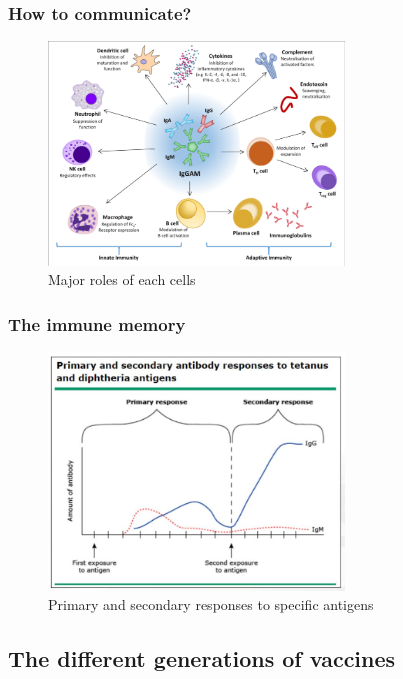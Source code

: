 \begin{frame}
    \frametitle{How to communicate?}
\begin{figure}
    \centering
    \includegraphics[width=0.7\textwidth]{imgs/Communication.png}
    \caption{Major roles of each cells \autocite{jarczakSepsisPathophysiologyTherapeutic2021}}
    \label{fig:responses10}
\end{figure}
\end{frame}

\begin{frame}
    \frametitle{The immune memory}
\begin{figure}
    \centering
    \includegraphics[width=0.7\textwidth]{imgs/PrimarySecondaryResponses.JPG}
    \caption{Primary and secondary responses to specific antigens \autocite{pinkComparisonImmunityGeneral}}
    \label{fig:responses12}
\end{figure}
\end{frame}


\subsection{The different generations of vaccines}

